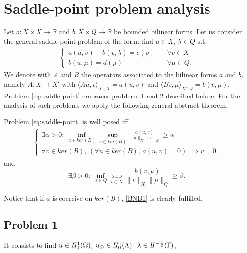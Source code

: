 \section{Saddle-point problem analysis}
Let $a: X \times X \rightarrow \mathbb{R}$ and $b: X\times Q \rightarrow \mathbb{R}$ be bounded bilinear forms. Let us consider the general saddle point problem of the form: find $u\in X$, $\lambda\in Q$ s.t.
\begin{eqnarray}\label{eq:saddle-point}
\begin{cases}
a(u,v)+b(v,\lambda)=c(v)\quad &\forall v\in X\\
b(u,\mu)=d(\mu) \quad &\forall \mu\in Q.
\end{cases}
\end{eqnarray}
We denote with $A$ and $B$ the operators associated to the bilinear forms $a$ and $b$, 
namely $A: X \longrightarrow X'$ with $\langle Au,v\rangle _{X',X} = a(u,v)$ and $\langle Bv,\mu\rangle_{X',Q} = b(v,\mu)$. Problem \eqref{eq:saddle-point} embraces problems 1 and 2 described before. For the analysis of such problems we apply the following general abstract theorem.
\begin{theorem}\label{th:bnb}
Problem \eqref{eq:saddle-point} is well posed iff 
\begin{eqnarray}\label{BNB1}
\begin{cases}
\exists \alpha >0 :\, \inf_{u\in ker(B)}\sup_{v\in ker(B)} \frac{a(u,v)}{\|u\|_{X}\|v\|_{X}}\geq \alpha\\
\forall v \in ker(B), \, \left( \forall u \in ker(B),\, a(u,v)=0 \right)\implies v=0.
\end{cases}
\end{eqnarray}
and 
\begin{equation}\label{eq:infsup}
\exists \beta >0:\,\inf_{\mu\in Q}\sup_{v\in X} \frac{b(v,\mu)}{\|v\|_{X}\|\mu\|_{Q}}\geq \beta .
\end{equation}
\end{theorem} 
Notice that if $a$ is coercive on $ker(B)$, \eqref{BNB1} is clearly fulfilled. \\

\subsection{Problem 1}
It consists to find $u \in H^1_0(\Omega),\ \ud \in H_0^1(\Lambda), \ \lambda \in H^{-\frac12}(\Gamma )$, %

